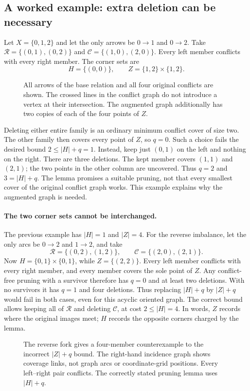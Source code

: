\subsection*{A worked example: extra deletion can be necessary}
Let $X=\{0,1,2\}$ and let the only arrows be $0\to1$ and $0\to2$.
Take $\mathcal R=\{(0,1),(0,2)\}$ and
$\mathcal C=\{(1,0),(2,0)\}$. Every left member conflicts with every
right member. The corner sets are
\[
H=\{(0,0)\},\qquad Z=\{1,2\}\times\{1,2\}.
\]
\begin{figure}[H]\centering
\caption{All arrows of the base relation and all four original conflicts are shown. The crossed lines in the conflict graph do not introduce a vertex at their intersection. The augmented graph additionally has two copies of each of the four points of $Z$.}
\end{figure}
Deleting either entire family is an ordinary minimum conflict cover of
size two. The other family then covers every point of $Z$, so $q=0$.
Such a choice fails the desired bound $2\le |H|+q=1$.
Instead, keep just $(0,1)$ on the left and nothing on the right.
There are three deletions. The kept member covers $(1,1)$ and $(2,1)$;
the two points in the other column are uncovered. Thus $q=2$ and
$3=|H|+q$. The lemma promises a suitable pruning, not that every smallest
cover of the original conflict graph works. This example explains why the
augmented graph is needed.

\paragraph{The two corner sets cannot be interchanged.}
The previous example has $|H|=1$ and $|Z|=4$. For the reverse imbalance,
let the only arcs be $0\to2$ and $1\to2$, and take
\[
\mathcal R=\{(0,2),(1,2)\},\qquad
\mathcal C=\{(2,0),(2,1)\}.
\]
Now $H=\{0,1\}\times\{0,1\}$, while $Z=\{(2,2)\}$.
Every left member conflicts with every right member, and every member
covers the sole point of $Z$. Any conflict-free pruning with a survivor
therefore has $q=0$ and at least two deletions. With no survivors it has
$q=1$ and four deletions. Thus replacing $|H|+q$ by $|Z|+q$ would fail
in both cases, even for this acyclic oriented graph. The correct bound
allows keeping all of $\mathcal R$ and deleting $\mathcal C$, at cost
$2\le |H|=4$. In words, $Z$ records where the original images meet;
$H$ records the opposite corners charged by the lemma.
\begin{figure}[H]\centering
\caption{The reverse fork gives a four-member counterexample to the incorrect $|Z|+q$ bound. The right-hand incidence graph shows coverage links, not graph arcs or coordinate-grid positions. Every left--right pair conflicts. The correctly stated pruning lemma uses $|H|+q$.}
\end{figure}

